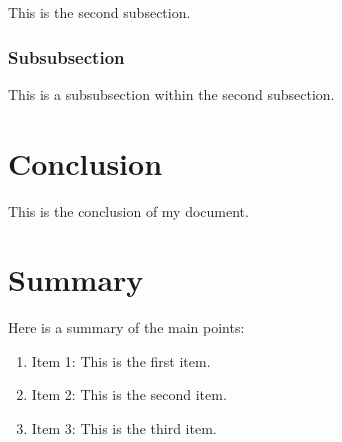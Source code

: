 \documentclass{article}
\begin{document}
This is the second subsection.

\subsubsection{Subsubsection}

This is a subsubsection within the second subsection.

\section{Conclusion}

This is the conclusion of my document.

\section{Summary}

Here is a summary of the main points:

\begin{enumerate}
  \item Item 1: This is the first item.
  \item Item 2: This is the second item.
  \item Item 3: This is the third item.
\end{enumerate}
\end{document}
